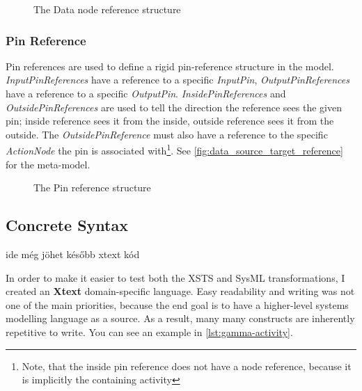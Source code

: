 \begin{figure}[!ht]
	\centering
	
	\caption{The Data node reference structure}
	\label{fig:data_source_target_reference_example}
\end{figure}

\subsubsection{Pin Reference}

Pin references are used to define a rigid pin-reference structure in the model. \emph{InputPinReferences} have a reference to a specific \emph{InputPin}, \emph{OutputPinReferences} have a reference to a specific \emph{OutputPin}. \emph{InsidePinReferences} and \emph{OutsidePinReferences} are used to tell the direction the reference sees the given pin; inside reference sees it from the inside, outside reference sees it from the outside. The \emph{OutsidePinReference} must also have a reference to the specific \emph{ActionNode} the pin is associated with\footnote{Note, that the inside pin reference does not have a node reference, because it is implicitly the containing activity}. See \autoref{fig:data_source_target_reference} for the meta-model.

\begin{figure}[!ht]
	\centering
	
	\caption{The Pin reference structure}
	\label{fig:pin_reference}
\end{figure}

\subsection{Concrete Syntax}

ide még jöhet később xtext kód

In order to make it easier to test both the XSTS and SysML transformations, I created an \textbf{Xtext} domain-specific language. Easy readability and writing was not one of the main priorities, because the end goal is to have a higher-level systems modelling language as a source. As a result, many many constructs are inherently repetitive to write. You can see an example in \autoref{lst:gamma-activity}.

